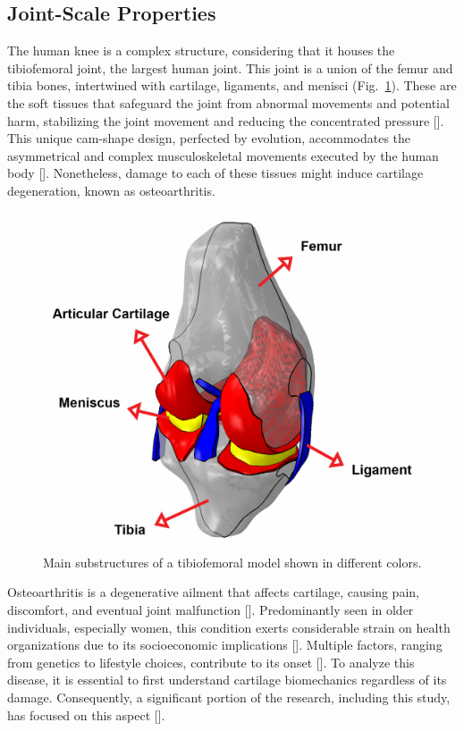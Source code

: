 \documentclass[12pt,a4paper]{report}
\begin{document}
\subsection{Joint-Scale Properties}
The human knee is a complex structure, considering that it houses the tibiofemoral joint, the largest human joint. This joint is a union of the femur and tibia bones, intertwined with cartilage, ligaments, and menisci (Fig.~\ref{knee}).
These are the soft tissues that safeguard the joint from abnormal movements and potential harm, stabilizing the joint movement and reducing the concentrated pressure [\cite{walker1975,mameri2022}]. This unique cam-shape design, perfected by evolution, accommodates the asymmetrical and complex musculoskeletal movements executed by the human body [\cite{dye1987,goldblatt2003}]. Nonetheless, damage to each of these tissues might induce cartilage degeneration, known as osteoarthritis.
%
\begin{figure}
\centering
\includegraphics[width=0.6\linewidth]{knee.jpg}
\caption{Main substructures of a tibiofemoral model shown in different colors.
\label{knee}}
\end{figure}

Osteoarthritis is a degenerative ailment that affects cartilage, causing pain, discomfort, and eventual joint malfunction [\cite{lespasio2017}]. Predominantly seen in older individuals, especially women, this condition exerts considerable strain on health organizations due to its socioeconomic implications [\cite{Chen2012,gillian2019}]. Multiple factors, ranging from genetics to lifestyle choices, contribute to its onset [\cite{loeser2016,mobasheri2017,astephen2021}]. To analyze this disease, it is essential to first understand cartilage biomechanics regardless of its damage. Consequently, a significant portion of the research, including this study, has focused on this aspect [\cite{kong2022}].
\end{document}
